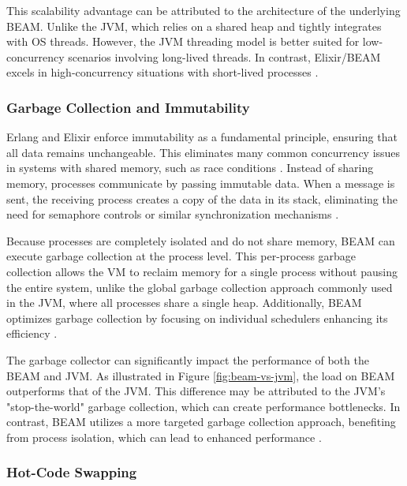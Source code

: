 This scalability advantage can be attributed to the architecture of the underlying \gls{BEAM}. Unlike the \gls{JVM}, which relies on a shared heap and tightly integrates with \gls{OS} threads. However, the \gls{JVM} threading model is better suited for low-concurrency scenarios involving long-lived threads. In contrast, Elixir/\gls{BEAM} excels in high-concurrency situations with short-lived processes \cite{erlang-concurrency-blog, Valkov2018}.

\subsubsection{Garbage Collection and Immutability}

Erlang and Elixir enforce immutability as a fundamental principle, ensuring that all data remains unchangeable. This eliminates many common concurrency issues in systems with shared memory, such as race conditions \cite{Valkov2018}. Instead of sharing memory, processes communicate by passing immutable data. When a message is sent, the receiving process creates a copy of the data in its stack, eliminating the need for semaphore controls or similar synchronization mechanisms \cite{Juric2024,erlang-concurrency-blog}.

Because processes are completely isolated and do not share memory, \gls{BEAM} can execute garbage collection at the process level. This per-process garbage collection allows the \gls{VM} to reclaim memory for a single process without pausing the entire system, unlike the global garbage collection approach commonly used in the \gls{JVM}, where all processes share a single heap. Additionally, \gls{BEAM} optimizes garbage collection by focusing on individual schedulers enhancing its efficiency \cite{Armstrong2013,Juric2024}.

The garbage collector can significantly impact the performance of both the \gls{BEAM} and \gls{JVM}. As illustrated in Figure \ref{fig:beam-vs-jvm}, the load on \gls{BEAM} outperforms that of the \gls{JVM}. This difference may be attributed to the \gls{JVM}'s "stop-the-world" garbage collection, which can create performance bottlenecks. In contrast, \gls{BEAM} utilizes a more targeted garbage collection approach, benefiting from process isolation, which can lead to enhanced performance \cite{Valkov2018, Juric2024}.

\subsubsection{Hot-Code Swapping}

